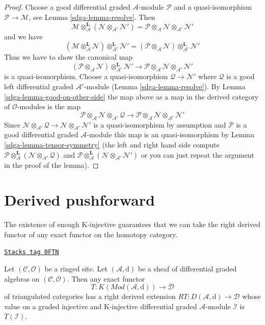 \begin{proof}

Choose a good differential graded $\mathcal{A}$-module
$\mathcal{P}$ and a quasi-isomorphism $\mathcal{P} \to \mathcal{M}$, see
Lemma \ref{sdga-lemma-resolve}. Then
$$
\mathcal{M}
\otimes_\mathcal{A}^\mathbf{L}
(\mathcal{N} \otimes_{\mathcal{A}'} \mathcal{N}') =
\mathcal{P} \otimes_\mathcal{A} \mathcal{N}
\otimes_{\mathcal{A}'} \mathcal{N}'
$$
and we have
$$
(\mathcal{M}
\otimes_\mathcal{A}^\mathbf{L} \mathcal{N})
\otimes_{\mathcal{A}'}^\mathbf{L} \mathcal{N}' =
(\mathcal{P} \otimes_\mathcal{A} \mathcal{N})
\otimes_{\mathcal{A}'}^\mathbf{L} \mathcal{N}'
$$
Thus we have to show the canonical map
$$
(\mathcal{P} \otimes_\mathcal{A} \mathcal{N})
\otimes_{\mathcal{A}'}^\mathbf{L} \mathcal{N}'
\longrightarrow
\mathcal{P} \otimes_\mathcal{A} \mathcal{N}
\otimes_{\mathcal{A}'} \mathcal{N}'
$$
is a quasi-isomorphism. Choose a quasi-isomorphism
$\mathcal{Q} \to \mathcal{N}'$ where $\mathcal{Q}$
is a good left differential graded $\mathcal{A}'$-module
(Lemma \ref{sdga-lemma-resolve}).
By Lemma \ref{sdga-lemma-good-on-other-side} the map
above as a map in the derived category of $\mathcal{O}$-modules is the map
$$
\mathcal{P} \otimes_\mathcal{A} \mathcal{N}
\otimes_{\mathcal{A}'} \mathcal{Q}
\longrightarrow
\mathcal{P} \otimes_\mathcal{A} \mathcal{N}
\otimes_{\mathcal{A}'} \mathcal{N}'
$$
Since $\mathcal{N} \otimes_{\mathcal{A}'} \mathcal{Q} \to
\mathcal{N} \otimes_{\mathcal{A}'} \mathcal{N}'$ is a quasi-isomorphism
by assumption and $\mathcal{P}$ is a good differential graded
$\mathcal{A}$-module this map is an quasi-isomorphism by
Lemma \ref{sdga-lemma-tensor-symmetry} (the left and right hand side
compute $\mathcal{P} \otimes_\mathcal{A}^\mathbf{L} (\mathcal{N}
\otimes_{\mathcal{A}'} \mathcal{Q})$ and
$\mathcal{P} \otimes_\mathcal{A}^\mathbf{L} (\mathcal{N}
\otimes_{\mathcal{A}'} \mathcal{N}')$ or you can just repeat
the argument in the proof of the lemma).
\end{proof}

\section{Derived pushforward}
\label{sdga-section-derived-pushforward}
The existence of enough K-injective guarantees that we can take the right
derived functor of any exact functor on the homotopy category.

\begin{lemma}
\label{sdga-lemma-right-derived}
\href{https://stacks.math.columbia.edu/tag/0FTN}{\texttt{Stacks tag 0FTN}}

Let $(\mathcal{C}, \mathcal{O})$ be a ringed site.
Let $(\mathcal{A}, \text{d})$ be a sheaf of differential graded algebras on
$(\mathcal{C}, \mathcal{O})$. Then any exact functor
$$
T : K(\textit{Mod}(\mathcal{A}, \text{d})) \longrightarrow \mathcal{D}
$$
of triangulated categories has a right derived extension
$RT : D(\mathcal{A}, \text{d}) \to \mathcal{D}$
whose value on a graded injective and K-injective
differential graded $\mathcal{A}$-module $\mathcal{I}$
is $T(\mathcal{I})$.
\end{lemma}

